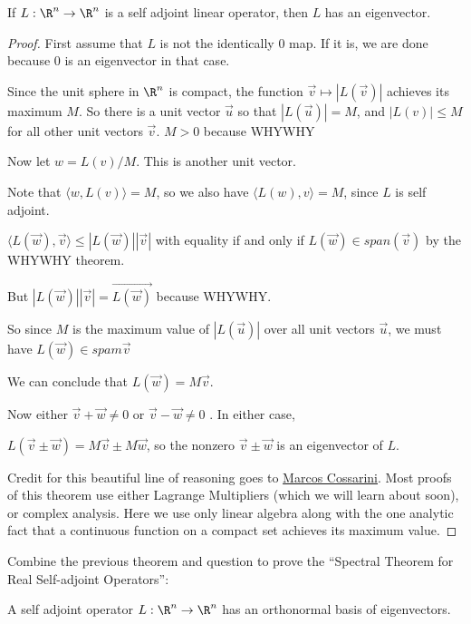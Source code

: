 \begin{theorem}
	If $L: \R^n \to \R^n$ is a self adjoint linear operator, then $L$ has an eigenvector.
\end{theorem}

\begin{proof}
	First assume that $L$ is not the identically $0$ map.  If it is, we are done because $0$ is an eigenvector in that case.
	
	Since the unit sphere in $\R^n$ is compact, the function $\vec{v} \mapsto |L(\vec{v})|$ achieves its maximum $M$.  So there is a unit vector 
	$\vec{u}$ so that $|L(\vec{u})| = M$, and $|L(v)| \leq M$ for all other unit vectors $\vec{v}$.  $M > 0$ because WHYWHY
	
	Now let $w = L(v)/M$.  This is another unit vector.
	
	Note that $\langle w, L(v)\rangle = M$, so we also have $\langle L(w), v \rangle = M$, since $L$ is self adjoint.
	
	$\langle L(\vec{w}),\vec{v}\rangle \leq |L(\vec{w})||\vec{v}|$ with equality if and only if $L(\vec{w}) \in span(\vec{v})$ by the WHYWHY theorem.
	
	But $|L(\vec{w})||\vec{v}| = \vec{L(\vec{w})}$ because WHYWHY.
	
	So since $M$ is the maximum value of $|L(\vec{u})|$ over all unit vectors $\vec{u}$, we must have  $L(\vec{w}) \in spam{\vec{v}}$
	
	We can conclude that $L(\vec{w}) = M\vec{v}$.
	
	Now either $\vec{v}+\vec{w} \neq 0$ or $\vec{v}-\vec{w} \neq 0$ .  In either case,
	
	$L(\vec{v} \pm \vec{w}) = M\vec{v} \pm M\vec{w}$, so the nonzero $\vec{v} \pm \vec{w}$ is an eigenvector of $L$.
	
	Credit for this beautiful line of reasoning goes to \href{http://mathoverflow.net/a/118759/1106}{Marcos Cossarini}.  Most proofs of this theorem use either 
	Lagrange Multipliers (which we will learn about soon), or complex analysis.  Here we use only linear algebra along with the one analytic fact that a continuous 
	function on a compact set achieves its maximum value.
\end{proof}

\begin{question}
	Combine the previous theorem and question to prove the ``Spectral Theorem for Real Self-adjoint Operators'':  
	
	\begin{theorem}
		A self adjoint operator $L : \R^n \to \R^n$ has an orthonormal basis of eigenvectors.
	\end{theorem}
	
\end{question}

